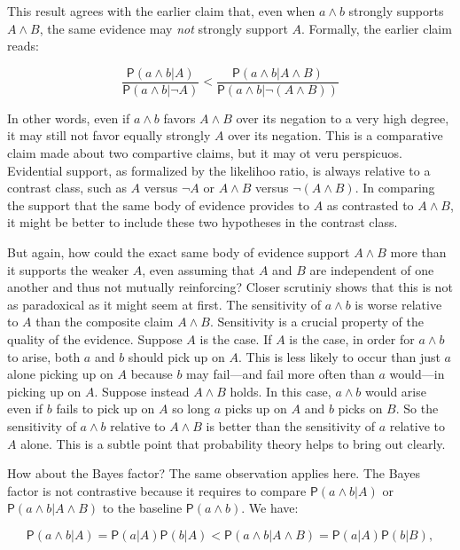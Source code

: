 \documentclass[10pt,dvipsnames,enabledeprecatedfontcommands]{scrartcl}
\newcommand{\pr}[1]{\mathsf{P}(#1)}
\begin{document}
This result agrees with the earlier claim that, even when \(a\wedge b\)
strongly supports \(A \wedge B\), the same evidence may \textit{not}
strongly support \(A\). Formally, the earlier claim reads:

\[\frac{\pr{a\wedge b \vert A}}{\pr{a\wedge b \vert \neg A}} < \frac{\pr{a\wedge b \vert A \wedge B}}{\pr{a\wedge b \vert \neg (A \wedge B)}}\]

\noindent In other words, even if \(a\wedge b\) favors \(A\wedge B\)
over its negation to a very high degree, it may still not favor equally
strongly \(A\) over its negation. This is a comparative claim made about
two compartive claims, but it may ot veru perspicuos. Evidential
support, as formalized by the likelihoo ratio, is always relative to a
contrast class, such as \(A\) versus \(\neg A\) or \(A\wedge B\) versus
\(\neg (A\wedge B)\). In comparing the support that the same body of
evidence provides to \(A\) as contrasted to \(A\wedge B\), it might be
better to include these two hypotheses in the contrast class.

But again, how could the exact same body of evidence support
\(A\wedge B\) more than it supports the weaker \(A\), even assuming that
\(A\) and \(B\) are independent of one another and thus not mutually
reinforcing? Closer scrutiniy shows that this is not as paradoxical as
it might seem at first. The sensitivity of \(a\wedge b\) is worse
relative to \(A\) than the composite claim \(A \wedge B\). Sensitivity
is a crucial property of the quality of the evidence. Suppose \(A\) is
the case. If \(A\) is the case, in order for \(a\wedge b\) to arise,
both \(a\) and \(b\) should pick up on \(A\). This is less likely to
occur than just \(a\) alone picking up on \(A\) because \(b\) may
fail---and fail more often than \(a\) would---in picking up on \(A\).
Suppose instead \(A\wedge B\) holds. In this case, \(a\wedge b\) would
arise even if \(b\) fails to pick up on \(A\) so long \(a\) picks up on
\(A\) and \(b\) picks on \(B\). So the sensitivity of \(a\wedge b\)
relative to \(A\wedge B\) is better than the sensitivity of \(a\)
relative to \(A\) alone. This is a subtle point that probability theory
helps to bring out clearly.

How about the Bayes factor? The same observation applies here. The Bayes
factor is not contrastive because it requires to compare
\(\pr{a\wedge b \vert A}\) or \(\pr{a\wedge b \vert A\wedge B}\) to the
baseline \(\pr{a\wedge b}\). We have:

\[\pr{a\wedge b \vert A}=\pr{a\vert A} \pr{b \vert A} < \pr{a\wedge b \vert A \wedge B}=\pr{a\vert A} \pr{b \vert B},\]
\end{document}
